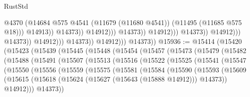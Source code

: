 \begin{lexlean}{RustStd}
\begin{coremodule}
                                                              @4370
                                                              (@14684
                                                                @575
                                                                @4541
                                                                (@11679 (@11680 @4541))
                                                                (@11495 (@11685 @575 @18)))
                                                              @14913))
                                                          @14373))
                                                      @14912)))
                                                @14373))
                                            @14912)))
                                      @14373))
                                  @14912)))
                            @14373))
                        @14912)))
                  @14373))
              @14912)))
        @14373))
@15936 := @15414
    (@15420
      (@15423
        (@15439
          (@15445
            (@15448
              (@15454
                (@15457
                  (@15473
                    (@15479
                      (@15482
                        (@15488
                          (@15491
                            (@15507
                              (@15513
                                (@15516
                                  (@15522
                                    (@15525
                                      (@15541
                                        (@15547
                                          (@15550
                                            (@15556
                                              (@15559
                                                (@15575
                                                  (@15581
                                                    (@15584
                                                      (@15590
                                                        (@15593
                                                          (@15609
                                                            (@15615
                                                              (@15618
                                                                (@15624
                                                                  (@15627 (@15643 (@15888 @14912)))
                                                                  @14373))
                                                              @14912)))
                                                        @14373))

\end{coremodule}
\end{lexlean}
